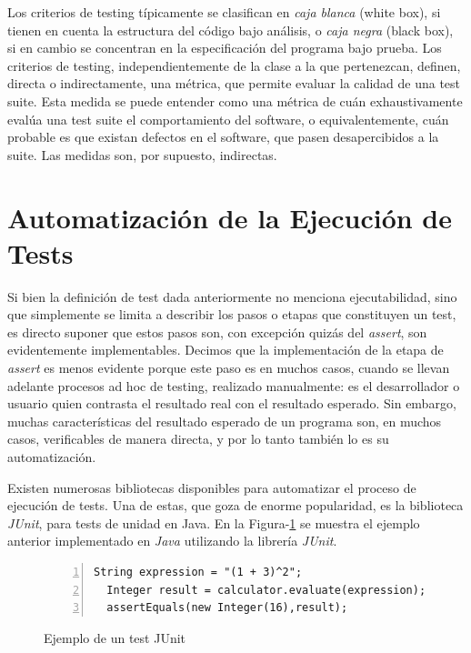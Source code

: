 Los criterios de testing t\'ipicamente se clasifican en \emph{caja blanca} (white box), si tienen en cuenta la estructura del c\'odigo bajo an\'alisis, o \emph{caja negra} (black box), si en cambio se concentran en la especificaci\'on del programa bajo prueba. Los criterios de testing, independientemente de la clase a la que pertenezcan, definen, directa o indirectamente, una m\'etrica, que permite evaluar la calidad de una test suite. Esta medida se puede entender como una m\'etrica de cu\'an exhaustivamente eval\'ua una test suite el comportamiento del software, o equivalentemente, cu\'an probable es que existan defectos en el software, que pasen desapercibidos a la suite. Las medidas son, por supuesto, indirectas. 

\section{Automatizaci\'on de la Ejecuci\'on de Tests}
\label{sec:preliminares.testing.automation}

Si bien la definici\'on de test dada anteriormente no menciona ejecutabilidad, sino que simplemente se limita a describir los pasos o etapas que constituyen un test, es directo suponer que estos pasos son, con excepci\'on quiz\'as del \emph{assert}, son evidentemente implementables. Decimos que la implementaci\'on de la etapa de \emph{assert} es menos evidente porque este paso es en muchos casos, cuando se llevan adelante procesos ad hoc de testing, realizado manualmente: es el desarrollador o usuario quien contrasta el resultado real con el resultado esperado. Sin embargo, muchas caracter\'isticas del resultado esperado de un programa son, en muchos casos, verificables de manera directa, y por lo tanto tambi\'en lo es su automatizaci\'on. 

Existen numerosas bibliotecas disponibles para automatizar el proceso de ejecuci\'on de tests. Una de estas, que goza de enorme popularidad, es la biblioteca \emph{JUnit}, para tests de unidad en Java. En la Figura-\ref{figures.examples.test.junit} se muestra el ejemplo anterior implementado en \emph{Java} utilizando la librer\'ia \emph{JUnit}.

\begin{figure}[ht!]
	\begin{lstlisting}[frame=single, mathescape=true,numbers=left,framexleftmargin=1.5em]
  String expression = "(1 + 3)^2";
  Integer result = calculator.evaluate(expression);
  assertEquals(new Integer(16),result);
	\end{lstlisting}
	\caption{Ejemplo de un test JUnit}
	\label{figures.examples.test.junit}
\end{figure}


